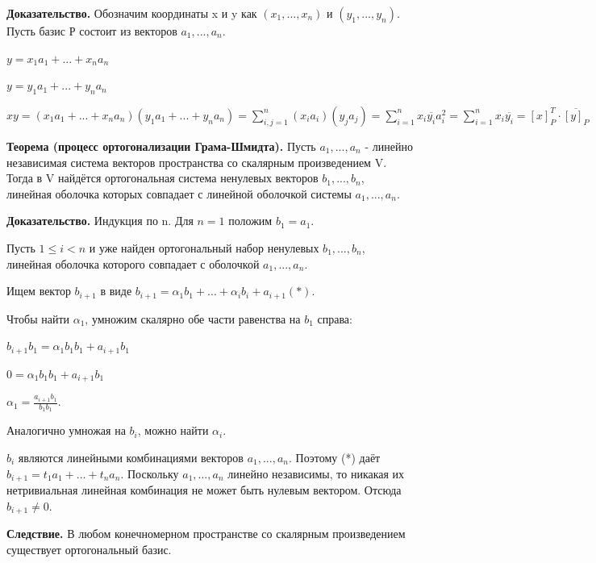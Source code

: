 \documentclass[a4paper]{article}
\begin{document}
\begin{hproof}
\textbf{Доказательство.} Обозначим координаты x и y как $(x_1, ..., x_n)$ и $(y_1, ..., y_n)$. Пусть базис Р состоит из векторов $a_1, ..., a_n$.

$y = x_1a_1+...+x_na_n$

$y = y_1a_1 + ... + y_na_n$

$\displaystyle xy = (x_1a_1+...+x_na_n)(y_1a_1 + ... + y_na_n) = \sum_{i,j=1}^n(x_ia_i)(y_ja_j) = \sum_{i=1}^n x_i \overline{y_i}a_i^2 = \sum_{i=1}^n x_i \overline{y_i} = [x]_P^T \cdot \overline{[y]_P}$
\end{hproof}

\begin{htheorem}
\textbf{Теорема (процесс ортогонализации Грама-Шмидта).} Пусть $a_1, ..., a_n$ - линейно независимая система векторов пространства со скалярным произведением V. Тогда в V найдётся ортогональная система ненулевых векторов $b_1, ..., b_n$, линейная оболочка которых совпадает с линейной оболочкой системы $a_1, ..., a_n$.
\end{htheorem}

\begin{hproof}
\textbf{Доказательство.}
Индукция по n. Для $n=1$ положим $b_1=a_1$.

Пусть $1 \leq i < n$ и уже найден ортогональный набор ненулевых $b_1, ..., b_n$, линейная оболочка которого совпадает с оболочкой $a_1, ..., a_n$.

Ищем вектор $b_{i+1}$ в виде $b_{i+1} = \alpha_1 b_1 + ... + \alpha_i b_i + a_{i+1} (*)$.

Чтобы найти $\alpha_1$, умножим скалярно обе части равенства на $b_1$ справа:

$b_{i+1} b_1 = \alpha_1 b_1 b_1 + a_{i+1} b_1$

$0 = \alpha_1 b_1 b_1 + a_{i+1} b_1$

$\displaystyle \alpha_1 = \frac{a_{i+1}b_1}{b_1b_1}$.

Аналогично умножая на $b_i$, можно найти $\alpha_i$.

$b_i$ являются линейными комбинациями векторов $a_1, ..., a_n$. Поэтому (*) даёт $b_{i+1} = t_1a_1 + ... + t_na_n$. Поскольку $a_1, ..., a_n$ линейно независимы, то никакая их нетривиальная линейная комбинация не может быть нулевым вектором. Отсюда $b_{i+1} \neq 0$.
\end{hproof}

\begin{htheorem}
\textbf{Следствие.} В любом конечномерном пространстве со скалярным произведением существует ортогональный базис.
\end{htheorem}
\end{document}
